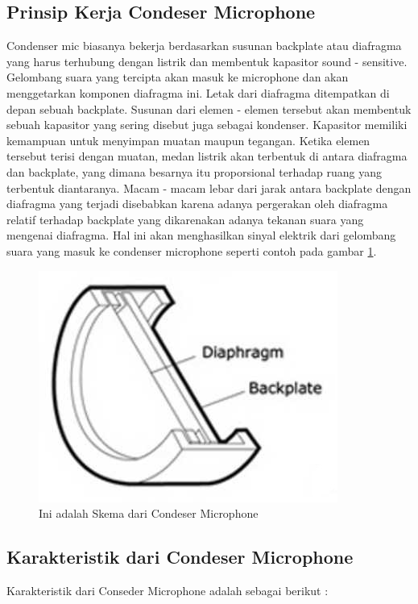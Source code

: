 \subsection{Prinsip Kerja Condeser Microphone}
Condenser mic biasanya bekerja berdasarkan susunan backplate atau diafragma yang harus terhubung dengan listrik dan membentuk kapasitor sound - sensitive. Gelombang suara yang tercipta akan masuk ke microphone dan akan menggetarkan komponen diafragma ini. Letak dari diafragma ditempatkan di depan sebuah backplate. Susunan dari elemen - elemen tersebut akan membentuk sebuah kapasitor yang sering disebut juga sebagai kondenser. Kapasitor memiliki kemampuan untuk menyimpan muatan maupun tegangan. Ketika elemen tersebut terisi dengan muatan, medan listrik akan terbentuk di antara diafragma dan backplate, yang dimana besarnya itu proporsional terhadap ruang yang terbentuk diantaranya. Macam - macam lebar dari jarak antara backplate dengan diafragma yang terjadi disebabkan karena adanya pergerakan oleh diafragma relatif terhadap backplate yang dikarenakan adanya tekanan suara yang mengenai diafragma. Hal ini akan menghasilkan sinyal elektrik dari gelombang suara yang masuk ke condenser microphone seperti contoh pada gambar \ref{fig:sscondesermicscheme}.
\begin{figure}[!htbp]
  \centering
  \includegraphics[width=.75\textwidth]{figures/Arduino/sscondesermicscheme.jpg}
  \caption{Ini adalah Skema dari Condeser Microphone}\label{fig:sscondesermicscheme}
\end{figure}

\subsection{Karakteristik dari Condeser Microphone}

Karakteristik dari Conseder Microphone adalah sebagai berikut :


